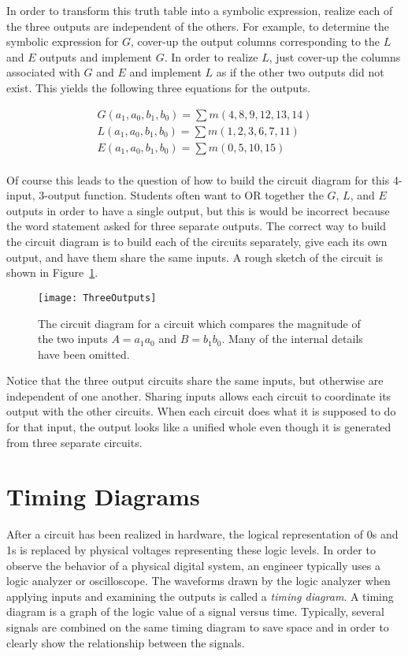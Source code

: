 In order to transform this truth table into a symbolic expression, 
realize each of the three outputs are independent of the
others.  For example, to determine the symbolic expression for $G$,
cover-up the output columns corresponding to the $L$ and $E$ outputs
and implement $G$.  In order to realize $L$, just cover-up the 
columns associated with $G$ and $E$ and implement $L$ as if
the other two outputs did not exist.  This yields the following
three equations for the outputs.

$$\begin{array}{l}
G(a_1,a_0,b_1,b_0)=\sum m(4,8,9,12,13,14)	\\
L(a_1,a_0,b_1,b_0)=\sum m(1,2,3,6,7,11)	\\
E(a_1,a_0,b_1,b_0)=\sum m(0,5,10,15)	\\
\end{array}$$

Of course this leads to the question of how to build the circuit
diagram for this 4-input, 3-output function.  Students often
want to OR together the $G$, $L$, and $E$ outputs in order to have
a single output, but this is would be incorrect because the word 
statement asked for three separate outputs.  The correct way to build
the circuit diagram is to build each of the circuits separately, give
each its own output, and have them share the same inputs.  A rough
sketch of the circuit is shown in Figure~\ref{fig:representationsThreeOutputs}.

\begin{figure}[ht]
\texttt{[image: ThreeOutputs]}
\caption{The circuit diagram for a circuit which compares the 
magnitude of the two inputs $A=a_1 a_0$ and $B=b_1 b_0$.  Many of 
the internal details have been omitted.}
\label{fig:representationsThreeOutputs}
\end{figure}

Notice that the three output circuits share the same inputs, but otherwise
are independent of one another.  Sharing inputs allows each
circuit to coordinate its output with the other circuits.  When
each circuit does what it is supposed to do for that input, the
output looks like a unified whole even though it is generated from
three separate circuits.

\section{Timing Diagrams}
After a circuit has been realized in hardware, the logical
representation of 0s and 1s is replaced by physical voltages
representing these logic levels.  In order to observe the behavior
of a physical digital system, an engineer typically uses a
logic analyzer or oscilloscope.  The waveforms drawn by the logic
analyzer when applying inputs and examining the outputs is called
a \textit{timing diagram}.  A timing diagram is a graph of the logic value 
of a signal versus time.  Typically, several signals are combined on the
same timing diagram to save space and in order to clearly 
show the relationship between the signals.

